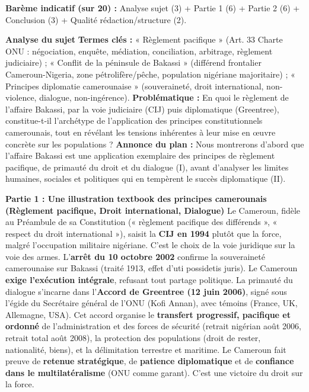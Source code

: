 \documentclass[11pt]{article}
\newcommand{\cle}[1]{{\popxbold\color{popdark}#1}}
\begin{document}
\begin{corrige}
\textbf{Barème indicatif (sur 20) :} Analyse sujet (3) + Partie 1 (6) + Partie 2 (6) + Conclusion (3) + Qualité rédaction/structure (2).

\textbf{Analyse du sujet}
\textbf{Termes clés :} « Règlement pacifique » (Art. 33 Charte ONU : négociation, enquête, médiation, conciliation, arbitrage, règlement judiciaire) ; « Conflit de la péninsule de Bakassi » (différend frontalier Cameroun-Nigeria, zone pétrolifère/pêche, population nigériane majoritaire) ; « Principes diplomatie camerounaise » (souveraineté, droit international, non-violence, dialogue, non-ingérence).
\textbf{Problématique :} En quoi le règlement de l'affaire Bakassi, par la voie judiciaire (CIJ) puis diplomatique (Greentree), constitue-t-il l'archétype de l'application des principes constitutionnels camerounais, tout en révélant les tensions inhérentes à leur mise en œuvre concrète sur les populations ?
\textbf{Annonce du plan :} Nous montrerons d'abord que l'affaire Bakassi est une application exemplaire des principes de règlement pacifique, de primauté du droit et du dialogue (I), avant d'analyser les limites humaines, sociales et politiques qui en tempèrent le succès diplomatique (II).

\textbf{Partie 1 : Une illustration textbook des principes camerounais (Règlement pacifique, Droit international, Dialogue)}
Le Cameroun, fidèle au Préambule de sa Constitution (« règlement pacifique des différends », « respect du droit international »), saisit la \textbf{CIJ en 1994} plutôt que la force, malgré l'occupation militaire nigériane. C'est le choix de la \cle{voie juridique} sur la \cle{voie des armes}. L'\textbf{arrêt du 10 octobre 2002} confirme la souveraineté camerounaise sur Bakassi (traité 1913, effet d'uti possidetis juris). Le Cameroun \textbf{exige l'exécution intégrale}, refusant tout partage politique.
La \cle{primauté du dialogue} s'incarne dans l'\textbf{Accord de Greentree (12 juin 2006)}, signé sous l'égide du Secrétaire général de l'ONU (Kofi Annan), avec témoins (France, UK, Allemagne, USA). Cet accord organise le \textbf{transfert progressif, pacifique et ordonné} de l'administration et des forces de sécurité (retrait nigérian août 2006, retrait total août 2008), la protection des populations (droit de rester, nationalité, biens), et la délimitation terrestre et maritime. Le Cameroun fait preuve de \textbf{retenue stratégique}, de \textbf{patience diplomatique} et de \textbf{confiance dans le multilatéralisme} (ONU comme garant). C'est une victoire du \cle{droit} sur la \cle{force}.


\end{corrige}
\end{document}
